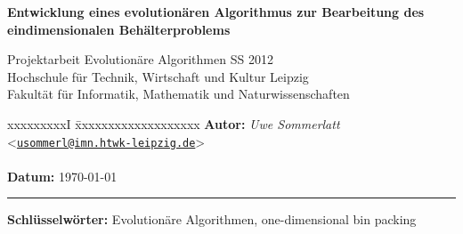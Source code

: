 \newcommand{\KEYWORDS}{Evolution\"are Algorithmen, one-dimensional bin packing}
\newcommand{\TITLE}{Entwicklung eines evolution\"aren Algorithmus zur Bearbeitung des eindimensionalen Beh\"alterproblems}
\newcommand{\SUBTITLE}{Projektarbeit Evolution\"are Algorithmen SS 2012}
\newcommand{\INSTITUTE}{Hochschule f\"ur Technik, Wirtschaft und Kultur Leipzig}
\newcommand{\DEPARTMENT}{Fakult\"at f\"ur Informatik, Mathematik und Naturwissenschaften}
\newcommand{\AUTHOR}{Uwe Sommerlatt}
\newcommand{\SUBJECT}{}





    \begin{titlepage}
        \titlepageheader
        \Large
        \vspace*{-3mm}
        \begin{minipage}[t]{.942\textwidth}
            \textbf{\TITLE}        
        \end{minipage}
        \vspace{.6em}

        \large
        \SUBTITLE\\
        \INSTITUTE\\
        \DEPARTMENT\par
        \normalsize
        \begin{tabbing}
             xxxxxxxxxI \= xxxxxxxxxxxxxxxxxxx\kill
             \textbf{Autor:} \> \textit{Uwe Sommerlatt} <\href{mailto:usommerl@imn.htwk-leipzig.de?subject=\TITLE}{\texttt{usommerl@imn.htwk-leipzig.de}}>\\\\
            \textbf{Datum:} \> \today
        \end{tabbing}
        \vspace{-1.3em}
        {\color{black}\rule[0cm]{\linewidth}{0.01cm}}\par
        \normalsize
        \textbf{Schlüsselwörter: }\KEYWORDS
        \par
    \end{titlepage}


